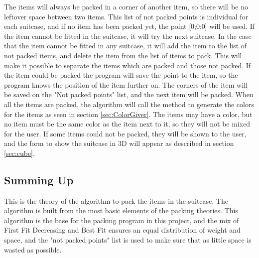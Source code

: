 The items will always be packed in a corner of another item, so there will be no leftover space between two items. This list of not packed points is individual for each suitcase, and if no item has been packed yet, the point [0;0;0] will be used. If the item cannot be fitted in the suitcase, it will try the next suitcase. In the case that the item cannot be fitted in any suitcase, it will add the item to the list of not packed items, and delete the item from the list of items to pack. This will make it possible to separate the items which are packed and those not packed. If the item could be packed the program will save the point to the item, so the program knows the position of the item further on. The corners of the item will be saved on the "Not packed points" list, and the next item will be packed.
When all the items are packed, the algorithm will call the method to generate the colors for the items as seen in section \ref{sec:ColorGiver}. The items may have a color, but no item must be the same color as the item next to it, so they will not be mixed for the user. If some items could not be packed, they will be shown to the user, and the form to show the suitcase in 3D will appear as described in section \ref{sec:cube}.

\subsection{Summing Up}
This is the theory of the algorithm to pack the items in the suitcase. The algorithm is built from the most basic elements of the packing theories. This algorithm is the base for the packing program in this project, and the mix of First Fit Decreasing and Best Fit ensures an equal distribution of weight and space, and the "not packed points" list is used to make sure that as little space is wasted as possible.
